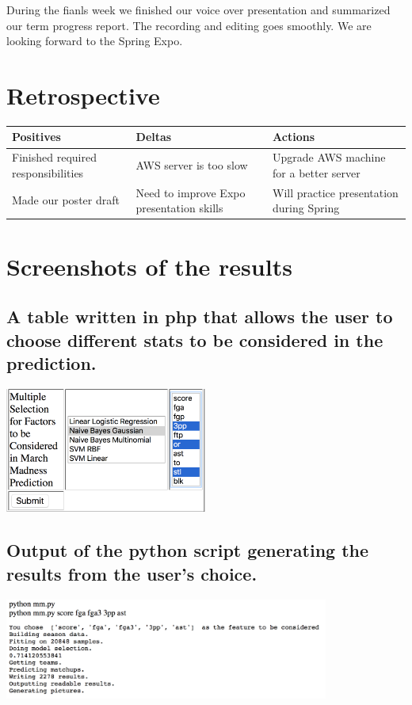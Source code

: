 \documentclass[letterpaper, 10pt,titlepage]{article}
\begin{document}
\par During the fianls week we finished our voice over presentation and summarized our term progress report. The recording and editing goes smoothly. We are looking forward to the Spring Expo.

\section{Retrospective}
\begin{center}
    \begin{tabular}{ | l | l | p{3cm} |}
    \hline
    Positives & Deltas & Actions \\ \hline
    Finished required responsibilities & AWS server is too slow & Upgrade AWS machine for a better server \\ \hline

    Made our poster draft & Need to improve Expo presentation skills & Will practice presentation during Spring \\ \hline
    \end{tabular}
\end{center}

\section{Screenshots of the results}
\graphicspath{ {images/} }

\par
\subsection{A table written in php that allows the user to choose different stats to be considered in the prediction.}
\bigbreak
\includegraphics[width=0.5\textwidth]{table.png}

\subsection{Output of the python script generating the results from the user's choice.}
\bigbreak
\includegraphics[width=0.8\textwidth]{result.png}
\end{document}

